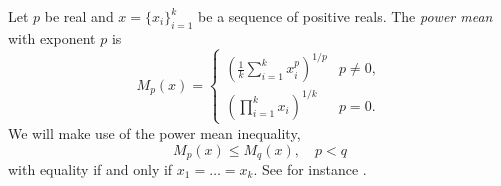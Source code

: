\documentclass[twoside]{article}
\DeclareMathOperator{\tsum}{\textstyle \sum}
\begin{document}

Let $p$ be real and $x=\{ x_{i}\} _{i=1}^{k}$ be a sequence
of positive reals. The \emph{power mean} with exponent $p$ is
\[
M_{p}(x)=\begin{cases}
(\frac{1}{k}\tsum_{i=1}^{k}x_{i}^{p})^{1/p} & p\neq0,\\
(\prod_{i=1}^{k}x_{i})^{1/k} & p=0.
\end{cases}
\]
We will make use of the power mean inequality,
\begin{equation}
M_{p}(x)\leq M_{q}(x),\quad p<q\label{eq:generalized mean inequality}
\end{equation}
with equality if and only if $x_{1}=\ldots=x_{k}$. See for instance \citep[][Chapter III]{Bullen2013-os}.
\end{document}
